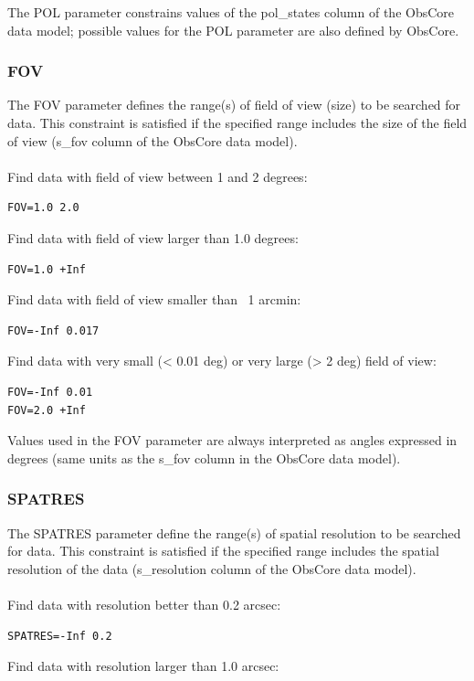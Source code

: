 \documentclass[11pt,a4paper]{ivoa}
\begin{document}
The POL parameter constrains values of the pol\_states column of the ObsCore data model; possible values for the POL parameter are also defined by ObsCore.


\subsubsection{FOV}

The FOV parameter defines the range(s) of field of view (size) to be searched for data. This constraint is satisfied if the specified range includes the size of the field of view (s\_fov column of the ObsCore data model). \\ \\
Find data with field of view between 1 and 2 degrees:

\begin{lstlisting}
FOV=1.0 2.0
\end{lstlisting}
Find data with field of view larger than 1.0 degrees:

\begin{lstlisting}
FOV=1.0 +Inf
\end{lstlisting}
Find data with field of view smaller than ~1 arcmin:

\begin{lstlisting}
FOV=-Inf 0.017
\end{lstlisting}
Find data with very small (< 0.01 deg) or very large (> 2 deg) field of view:

\begin{lstlisting}
FOV=-Inf 0.01
FOV=2.0 +Inf
\end{lstlisting}

Values used in the FOV parameter are always interpreted as angles expressed in degrees (same units as the s\_fov column in the ObsCore data model).

\subsubsection{SPATRES}

The SPATRES parameter define the range(s) of spatial resolution to be searched for data. This constraint is satisfied if the specified range includes the spatial resolution of the data (s\_resolution column of the ObsCore data model). \\ \\
Find data with resolution better than 0.2 arcsec:

\begin{lstlisting}
SPATRES=-Inf 0.2
\end{lstlisting}
Find data with resolution larger than 1.0 arcsec:
\end{document}
